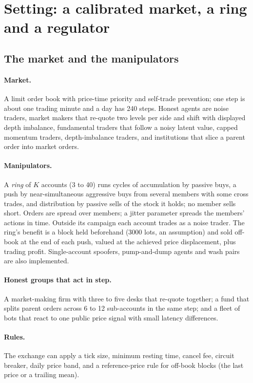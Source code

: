 \section{Setting: a calibrated market, a ring and a regulator}\label{sec:sim}

\subsection{The market and the manipulators}\label{sec:market}

\paragraph{Market.} A limit order book with price-time priority and self-trade prevention; one step is about one trading minute and a day has 240 steps. Honest agents are noise traders, market makers that re-quote two levels per side and shift with displayed depth imbalance, fundamental traders that follow a noisy latent value, capped momentum traders, depth-imbalance traders, and institutions that slice a parent order into market orders.

\paragraph{Manipulators.} A \emph{ring} of $K$ accounts (3 to 40) runs cycles of accumulation by passive buys, a push by near-simultaneous aggressive buys from several members with some cross trades, and distribution by passive sells of the stock it holds; no member sells short. Orders are spread over members; a jitter parameter spreads the members' actions in time. Outside its campaign each account trades as a noise trader. The ring's benefit is a block held beforehand (3000 lots, an assumption) and sold off-book at the end of each push, valued at the achieved price displacement, plus trading profit. Single-account spoofers, pump-and-dump agents and wash pairs are also implemented.

\paragraph{Honest groups that act in step.} A market-making firm with three to five desks that re-quote together; a fund that splits parent orders across 6 to 12 sub-accounts in the same step; and a fleet of bots that react to one public price signal with small latency differences.

\paragraph{Rules.} The exchange can apply a tick size, minimum resting time, cancel fee, circuit breaker, daily price band, and a reference-price rule for off-book blocks (the last price or a trailing mean).

